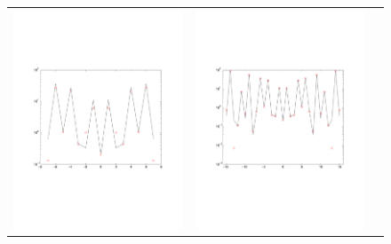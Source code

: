 \begin{figure}[htpb]
\begin{tabular}{ccc}
  \includegraphics[scale=0.25]{figs/tracAliasingUp2N16} &
  \includegraphics[scale=0.25]{figs/tracAliasingUp2N32} \\

\end{tabular}
\end{figure}
